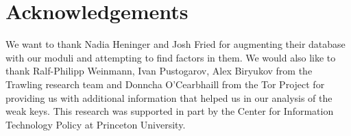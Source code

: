 \section*{Acknowledgements}
We want to thank Nadia Heninger and Josh Fried for augmenting their database
with our moduli and attempting to find factors in them. We would also like to thank Ralf-Philipp Weinmann, Ivan Pustogarov, Alex Biryukov from the Trawling research team and Donncha O'Cearbhaill from the Tor Project for providing us with additional information that helped us in our analysis of the weak keys. This research was supported in part by the Center for Information Technology Policy at Princeton
University.

